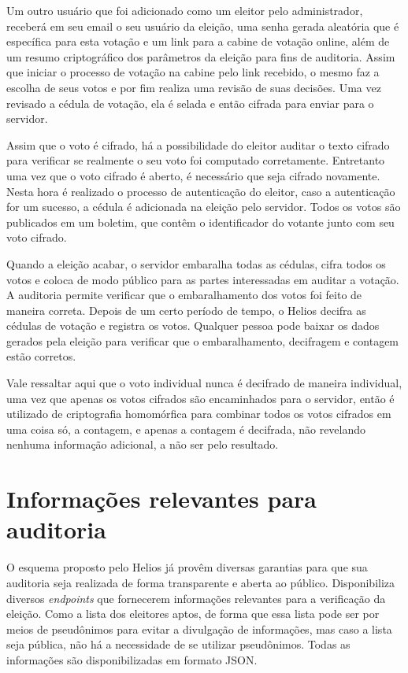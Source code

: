 \documentclass{ufsctex/ufsctex}
\begin{document}
Um outro usuário que foi adicionado como um eleitor pelo administrador,
receberá em seu email o seu usuário da eleição, uma senha gerada aleatória que
é específica para esta votação e um link para a cabine de votação online, além
de um resumo criptográfico dos parâmetros da eleição para fins de auditoria.
Assim que iniciar o processo de votação na cabine pelo link recebido, o mesmo
faz a escolha de seus votos e por fim realiza uma revisão de suas decisões. Uma
vez revisado a cédula de votação, ela é selada e então cifrada para enviar para
o servidor.

Assim que o voto é cifrado, há a possibilidade do eleitor auditar o texto
cifrado para verificar se realmente o seu voto foi computado corretamente.
Entretanto uma vez que o voto cifrado é aberto, é necessário que seja cifrado
novamente. Nesta hora é realizado o processo de autenticação do eleitor, caso a
autenticação for um sucesso, a cédula é adicionada na eleição pelo servidor.
Todos os votos são publicados em um boletim, que contêm o identificador do
votante junto com seu voto cifrado.

Quando a eleição acabar, o servidor embaralha todas as cédulas, cifra todos os
votos e coloca de modo público para as partes interessadas em auditar a
votação. A auditoria permite verificar que o embaralhamento dos votos foi feito
de maneira correta. Depois de um certo período de tempo, o Helios decifra as
cédulas de votação e registra os votos. Qualquer pessoa pode baixar os dados
gerados pela eleição para verificar que o embaralhamento, decifragem e contagem
estão corretos.

Vale ressaltar aqui que o voto individual nunca é decifrado de maneira
individual, uma vez que apenas os votos cifrados são encaminhados para o servidor,
então é utilizado de criptografia homomórfica para combinar todos os votos
cifrados em uma coisa só, a contagem,  e apenas a contagem é decifrada, não
revelando nenhuma informação adicional, a não ser pelo resultado.

\section{Informações relevantes para auditoria}


O esquema proposto pelo Helios já provêm diversas garantias para que sua
auditoria seja realizada de forma transparente e aberta ao público.
Disponibiliza diversos \textit{endpoints} que fornecerem informações relevantes
para a verificação da eleição. Como a lista dos eleitores aptos, de forma que
essa lista pode ser por meios de pseudônimos para evitar a divulgação de
informações, mas caso a lista seja pública, não há a necessidade de se utilizar
pseudônimos. Todas as informações são disponibilizadas em formato JSON.
\end{document}
